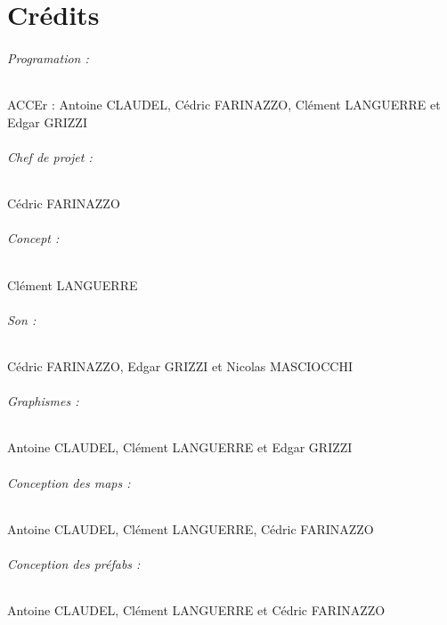 \documentclass[titlepage, 13px, a4paper]{report}
\begin{document}
\part{Crédits} 
\paragraph*{Programation : } \hspace{0pt}
ACCEr :
Antoine CLAUDEL, 
Cédric FARINAZZO, 
Clément LANGUERRE et  
Edgar GRIZZI \\

\paragraph*{Chef de projet : } \hspace{0pt}
Cédric FARINAZZO \\

\paragraph*{Concept : } \hspace{0pt}
Clément LANGUERRE \\

\paragraph*{Son : } \hspace{0pt}
Cédric FARINAZZO, 
Edgar GRIZZI et 
Nicolas MASCIOCCHI \\

\paragraph*{Graphismes : } \hspace{0pt}
Antoine CLAUDEL, 
Clément LANGUERRE et 
Edgar GRIZZI \\

\paragraph*{Conception des maps : } \hspace{0pt}
Antoine CLAUDEL, 
Clément LANGUERRE, 
Cédric FARINAZZO \\

\paragraph*{Conception des préfabs : } \hspace{0pt}
Antoine CLAUDEL, 
Clément LANGUERRE et 
Cédric FARINAZZO \\
\end{document}
